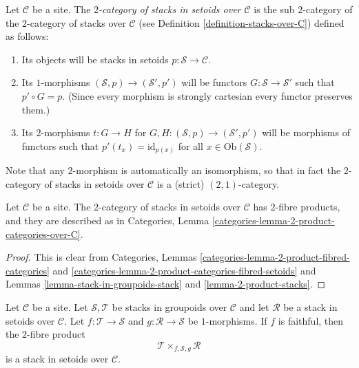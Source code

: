 \begin{definition}
\label{definition-stacks-in-setoids-over-C}
Let $\mathcal{C}$ be a site.
The {\it $2$-category of stacks in setoids over $\mathcal{C}$}
is the sub $2$-category of the $2$-category of stacks
over $\mathcal{C}$ (see Definition \ref{definition-stacks-over-C})
defined as follows:
\begin{enumerate}
\item Its objects will be stacks in setoids
$p : \mathcal{S} \to \mathcal{C}$.
\item Its $1$-morphisms $(\mathcal{S}, p) \to (\mathcal{S}', p')$
will be functors $G : \mathcal{S} \to \mathcal{S}'$ such that
$p' \circ G = p$. (Since every morphism is strongly cartesian
every functor preserves them.)
\item Its $2$-morphisms $t : G \to H$ for
$G, H : (\mathcal{S}, p) \to (\mathcal{S}', p')$
will be morphisms of functors
such that $p'(t_x) = \text{id}_{p(x)}$
for all $x \in \text{Ob}(\mathcal{S})$.
\end{enumerate}
\end{definition}

\noindent
Note that any $2$-morphism is automatically an isomorphism, so
that in fact the $2$-category of stacks in setoids over $\mathcal{C}$
is a (strict) $(2,1)$-category.

\begin{lemma}
\label{lemma-2-product-stacks-in-setoids}
Let $\mathcal{C}$ be a site.
The $2$-category of stacks in setoids over $\mathcal{C}$
has 2-fibre products, and they are described as in
Categories, Lemma \ref{categories-lemma-2-product-categories-over-C}.
\end{lemma}

\begin{proof}
This is clear from
Categories, Lemmas \ref{categories-lemma-2-product-fibred-categories} and
\ref{categories-lemma-2-product-categories-fibred-setoids}
and
Lemmas \ref{lemma-stack-in-groupoids-stack} and
\ref{lemma-2-product-stacks}.
\end{proof}

\begin{lemma}
\label{lemma-2-fibre-product-gives-stack-in-setoids}
Let $\mathcal{C}$ be a site.
Let $\mathcal{S}, \mathcal{T}$ be stacks in groupoids over $\mathcal{C}$
and let $\mathcal{R}$ be a stack in setoids over $\mathcal{C}$.
Let $f : \mathcal{T} \to \mathcal{S}$ and $g : \mathcal{R} \to \mathcal{S}$
be $1$-morphisms. If $f$ is faithful, then the $2$-fibre product
$$
\mathcal{T} \times_{f, \mathcal{S}, g} \mathcal{R}
$$
is a stack in setoids over $\mathcal{C}$.
\end{lemma}

